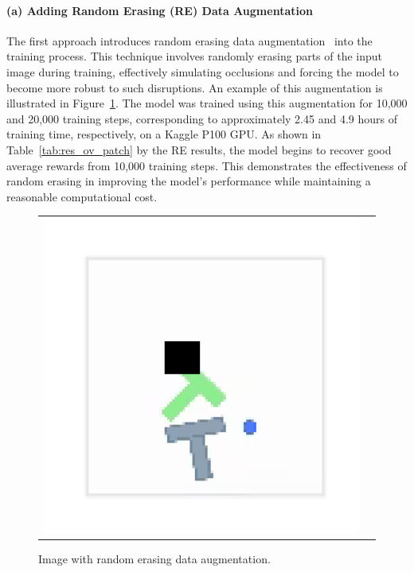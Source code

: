 \paragraph{(a) Adding Random Erasing (RE) Data Augmentation}
The first approach introduces random erasing data augmentation~\cite{zhong2020random} into the training process.
This technique involves randomly erasing parts of the input image during training, effectively simulating occlusions and forcing the model to become more robust to such disruptions.
An example of this augmentation is illustrated in Figure~\ref{fig:erasing}.
The model was trained using this augmentation for 10,000 and 20,000 training steps, corresponding to approximately 2.45 and 4.9 hours of training time, respectively, on a Kaggle P100 GPU.
As shown in Table~\ref{tab:res_ov_patch} by the RE results, the model begins to recover good average rewards from 10,000 training steps.
This demonstrates the effectiveness of random erasing in improving the model's performance while maintaining a reasonable computational cost.

\begin{figure}[!htb]
  \centering
  \begin{tabular}{cc}
    \includegraphics[width=0.49\linewidth]{figures/fig_erasing.pdf}
  \end{tabular}
  \caption{Image with random erasing data augmentation.}
  \label{fig:erasing}
\end{figure}


